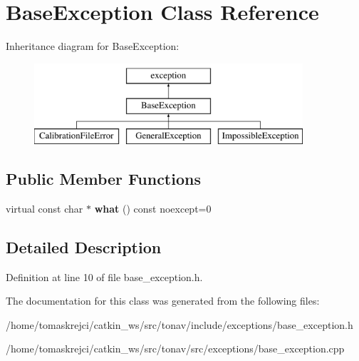 \hypertarget{class_base_exception}{\section{Base\-Exception Class Reference}
\label{class_base_exception}
}
Inheritance diagram for Base\-Exception\-:\begin{figure}[H]
\begin{center}
\leavevmode
\includegraphics[height=3.000000cm]{class_base_exception}
\end{center}
\end{figure}
\subsection*{Public Member Functions}
\begin{DoxyCompactItemize}
\item 
\hypertarget{class_base_exception_a9a4668c1da76b424a113d600f313b67f}{virtual const char $\ast$ {\bfseries what} () const noexcept=0}\label{class_base_exception_a9a4668c1da76b424a113d600f313b67f}

\end{DoxyCompactItemize}


\subsection{Detailed Description}


Definition at line 10 of file base\-\_\-exception.\-h.



The documentation for this class was generated from the following files\-:\begin{DoxyCompactItemize}
\item 
/home/tomaskrejci/catkin\-\_\-ws/src/tonav/include/exceptions/base\-\_\-exception.\-h\item 
/home/tomaskrejci/catkin\-\_\-ws/src/tonav/src/exceptions/base\-\_\-exception.\-cpp\end{DoxyCompactItemize}
